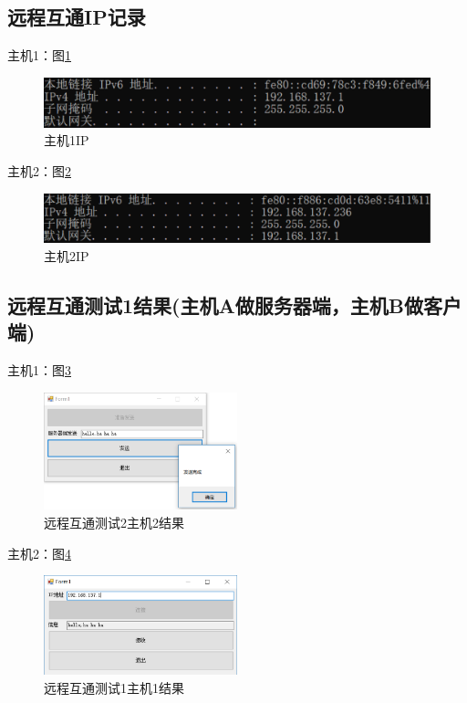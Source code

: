 \documentclass[a4paper]{ctexrep}
\begin{document}
\begin{spacing}{1.5}
\newpage
\subsection{远程互通IP记录}
主机1：图\ref{IP1}
\begin{figure}[htbp]
	\centering
	\includegraphics [width=1\textwidth]{figure//IP1.png}
	\caption{主机1IP}\label{IP1}
\end{figure}

主机2：图\ref{IP2}
\begin{figure}[htbp]
	\centering
	\includegraphics [width=1\textwidth]{figure//IP2.png}
	\caption{主机2IP}\label{IP2}
\end{figure}

\subsection{远程互通测试1结果(主机A做服务器端，主机B做客户端)}
主机1：图\ref{remote1local1}
\begin{figure}[htbp]
	\centering
	\includegraphics [width=0.5\textwidth]{figure//remote1local1.png}
	\caption{远程互通测试2主机2结果}\label{remote1local1}
\end{figure}

\newpage
主机2：图\ref{remote1local2}
\begin{figure}[htbp]
	\centering
	\includegraphics [width=0.5\textwidth]{figure//remote1local2.png}
	\caption{远程互通测试1主机1结果}\label{remote1local2}
\end{figure}


\end{spacing}
\end{document}
